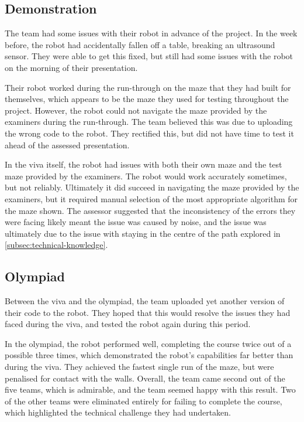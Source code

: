     \subsection{Demonstration}\label{subsec:viva-demonstration}
        The team had some issues with their robot in advance of the project.
        In the week before, the robot had accidentally fallen off a table, breaking an ultrasound sensor.
        They were able to get this fixed, but still had some issues with the robot on the morning of their presentation.

        Their robot worked during the run-through on the maze that they had built for themselves, which appears to be the maze they used for testing throughout the project.
        However, the robot could not navigate the maze provided by the examiners during the run-through.
        The team believed this was due to uploading the wrong code to the robot.
        They rectified this, but did not have time to test it ahead of the assessed presentation.

        In the viva itself, the robot had issues with both their own maze and the test maze provided by the examiners.
        The robot would work accurately sometimes, but not reliably.
        Ultimately it did succeed in navigating the maze provided by the examiners, but it required manual selection of the most appropriate algorithm for the maze shown.
        The assessor suggested that the inconsistency of the errors they were facing likely meant the issue was caused by noise, and the issue was ultimately due to the issue with staying in the centre of the path explored in \autoref{subsec:technical-knowledge}.

    \subsection{Olympiad}\label{subsec:viva-olympiad}
        Between the viva and the olympiad, the team uploaded yet another version of their code to the robot.
        They hoped that this would resolve the issues they had faced during the viva, and tested the robot again during this period.

        In the olympiad, the robot performed well, completing the course twice out of a possible three times, which demonstrated the robot's capabilities far better than during the viva.
        They achieved the fastest single run of the maze, but were penalised for contact with the walls.
        Overall, the team came second out of the five teams, which is admirable, and the team seemed happy with this result.
        Two of the other teams were eliminated entirely for failing to complete the course, which highlighted the technical challenge they had undertaken.